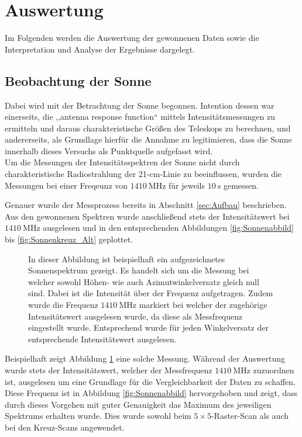 \section{Auswertung}
Im Folgenden werden die Auswertung der gewonnenen Daten sowie die Interpretation und Analyse der Ergebnisse dargelegt.
    \subsection{Beobachtung der Sonne}
    Dabei wird mit der Betrachtung der Sonne begonnen.
    Intention dessen war einerseits, die ,,antenna response function`` mittels Intensitätsmessungen zu ermitteln und
    daraus charakteristische Größen des Teleskops zu berechnen, und andererseits, als Grundlage hierfür die Annahme zu legitimieren,
    dass die Sonne innerhalb dieses Versuchs als Punktquelle aufgefasst wird.\\

    Um die Messungen der Intensitätsspektren der Sonne nicht durch charakteristische Radiostrahlung der
    21-\si{\centi \metre}-Linie zu beeinflussen,
    wurden die Messungen bei einer Freqeunz von $\SI{1410}{\mega \hertz}$ für jeweils $\SI{10}{\second}$ gemessen.

    Genauer wurde der Messprozess bereits in Abschnitt \ref{sec:Aufbau} beschrieben. 
    Aus den gewonnenen Spektren wurde anschließend stets der Intensitätswert bei $\SI{1410}{\mega \hertz}$ ausgelesen und in den entsprechenden Abbildungen \ref{fig:Sonnenabbild} bis \ref{fig:Sonnenkreuz_Alt} geplottet. 

    \begin{figure}[ht]
        \centering
        
        \caption[Beispielspektrum der Sonnenmessungen]{In dieser Abbildung ist beispielhaft ein aufgezeichnetes Sonnenspektrum gezeigt. Es handelt sich um die Messung bei welcher sowohl Höhen- wie auch Azimutwinkelversatz gleich null sind. Dabei ist die Intensität über der Frequenz aufgetragen. Zudem wurde die Frequenz $\SI{1410}{\mega \hertz}$ markiert bei welcher der zugehörige Intensitätswert ausgelesen wurde, da diese als Messfrequenz eingestellt wurde. Entsprechend wurde für jeden Winkelversatz der entsprechende Intensitätswert ausgelesen.}
        \label{fig:Sonnenspektrum}
    \end{figure}

    Beispielhaft zeigt Abbildung \ref{fig:Sonnenspektrum} eine solche Messung. Während der Auswertung wurde stets der Intensitätswert, welcher der Messfrequenz $\SI{1410}{\mega \hertz}$ zuzuordnen ist, ausgelesen um eine Grundlage für die Vergleichbarkeit der Daten zu schaffen. Diese Frequenz ist in Abbildung \ref{fig:Sonnenabbild} hervorgehoben und zeigt, dass durch dieses Vorgehen mit guter Genauigkeit das Maximum des jeweiligen Spektrums erhalten wurde. Dies wurde sowohl beim $5 \times 5$-Raster-Scan als auch bei den Kreuz-Scans angewendet.

